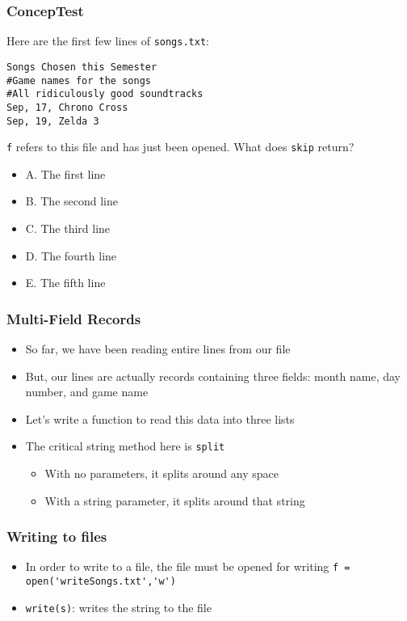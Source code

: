 \documentclass{beamer}
\begin{document}
\begin{frame}[fragile]
\frametitle{ConcepTest}
Here are the first few lines of \verb|songs.txt|:
\begin{small}
\begin{verbatim}
Songs Chosen this Semester
#Game names for the songs
#All ridiculously good soundtracks
Sep, 17, Chrono Cross
Sep, 19, Zelda 3
\end{verbatim}
\end{small}

\begin{scriptsize}

\end{scriptsize}

\verb|f| refers to this file and has just been opened. What does \verb|skip| return?
\begin{itemize}
\item A. The first line
\item B. The second line
\item C. The third line
\item D. The fourth line
\item E. The fifth line
\end{itemize}
\end{frame}

\begin{frame}[fragile]
\frametitle{Multi-Field Records}
\begin{itemize}
\item So far, we have been reading entire lines from our file
\item But, our lines are actually records containing three fields: month name, day number, and game name
\item Let's write a function to read this data into three lists
\item The critical string method here is \verb|split|
\begin{itemize}
\item With no parameters, it splits around any space
\item With a string parameter, it splits around that string
 \end{itemize}
\end{itemize}
\end{frame}

\begin{frame}[fragile]
\frametitle{Writing to files}

\begin{itemize}
\item In order to write to a file, the file must be opened for writing
\verb|f = open('writeSongs.txt','w')|
\item \verb|write(s)|: writes the string to the file

\end{itemize}

\end{frame}
\end{document}
